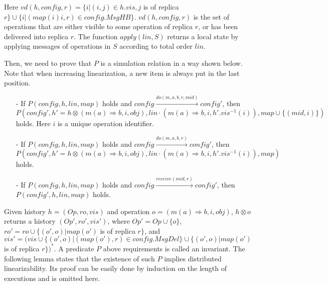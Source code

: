 Here $\mathit{vd}(h,\mathit{config},r) = \{ i \vert (i,j) \in h.\mathit{vis}, j$ is of replica $r \} \cup \{ i \vert (\mathit{map}(i)i,r) \in \mathit{config}.\mathit{MsgHB} \}$. $\mathit{vd}(h,\mathit{config},r)$ is the set of operations that are either visible to some operation of replica $r$, or has been delivered into replica $r$. The function $\mathit{apply}(\mathit{lin},S)$ returns a local state by applying messages of operations in $S$ according to total order $\mathit{lin}$.


Then, we need to prove that $P$ is a simulation relation in a way shown below. Note that when increasing linearization, a new item is always put in the last position.

\begin{itemize}
\setlength{\itemsep}{0.5pt}
\item[-] If $P(\mathit{config},h,\mathit{lin},\mathit{map})$ holds and $\mathit{config} {\xrightarrow{\mathit{do}(m,a,b,r,\mathit{mid})}} \mathit{config}'$, then $P(\mathit{config}', h' = h \otimes (m(a) \Rightarrow b,i,\mathit{obj}), \mathit{lin} \cdot (m(a) \Rightarrow b,i,h'.\mathit{vis}^{-1}(i)),\mathit{map} \cup \{ (\mathit{mid}, i) \})$ holds. Here $i$ is a unique operation identifier.

\item[-] If $P(\mathit{config},h,\mathit{lin},\mathit{map})$ holds and $\mathit{config} {\xrightarrow{\mathit{do}(m,a,b,r)}} \mathit{config}'$, then $P(\mathit{config}',h' = h \otimes (m(a) \Rightarrow b,i,\mathit{obj}), \mathit{lin} \cdot (m(a) \Rightarrow b,i,h'.\mathit{vis}^{-1}(i)),\mathit{map})$ holds.

\item[-] If $P(\mathit{config},h,\mathit{lin},\mathit{map})$ holds and $\mathit{config} {\xrightarrow{\mathit{receive}(\mathit{mid},r)}} \mathit{config}'$, then $P(\mathit{config}',h,\mathit{lin},\mathit{map})$ holds.
\end{itemize}

Given history $h = (\mathit{Op},\mathit{ro},\mathit{vis})$ and operation $o = (m(a) \Rightarrow b,i,\mathit{obj})$, $h \otimes o$ returns a history $(\mathit{Op}',\mathit{ro}',\mathit{vis}')$, where $\mathit{Op}' = \mathit{Op} \cup \{ o \}$, $\mathit{ro}' = \mathit{ro} \cup \{ (o',o) \vert \mathit{map}(o')$ is of replica $r \}$, and $\mathit{vis}' = (\mathit{vis} \cup \{ (o',o) \vert (\mathit{map}(o'),r) \in \mathit{config}.\mathit{MsgDel} \} \cup \{ (o',o) \vert \mathit{map}(o')$ is of replica $r \})^*$. A predicate $P$ above requirements is called an invariant. The following lemma states that the existence of such $P$ implies distributed linearizability. Its proof can be easily done by induction on the length of executions and is omitted here.

